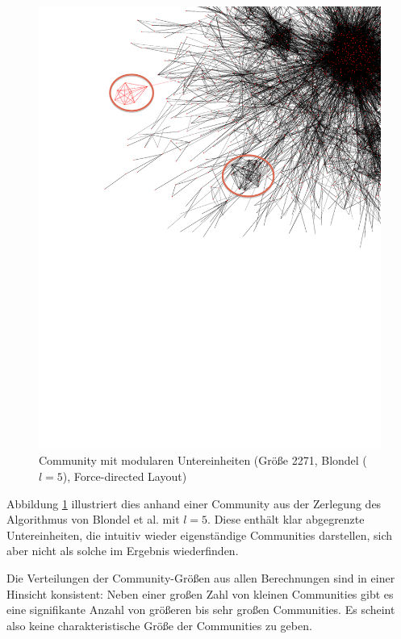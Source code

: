 \begin{figure}[ht!]
  \centering
  \includegraphics[scale=0.7]{images/blondel-l5-com-c3a5eaab680984b123037897b0be74bf-edit.pdf}
  \caption{Community mit modularen Untereinheiten (Größe 2271,
    Blondel ($l=5$), Force-directed Layout)}
  \label{fig:large-modular}
\end{figure}

Abbildung \ref{fig:large-modular} illustriert dies anhand einer
Community aus der Zerlegung des Algorithmus von Blondel et al. mit
$l=5$. Diese enthält klar abgegrenzte Untereinheiten, die intuitiv
wieder eigenständige Communities darstellen, sich aber nicht als
solche im Ergebnis wiederfinden.

Die Verteilungen der Community-Größen aus allen Berechnungen sind
in einer Hinsicht konsistent: Neben einer großen Zahl von kleinen
Communities gibt es eine signifikante Anzahl von größeren bis sehr
großen Communities. Es scheint also keine charakteristische Größe
der Communities zu geben.

